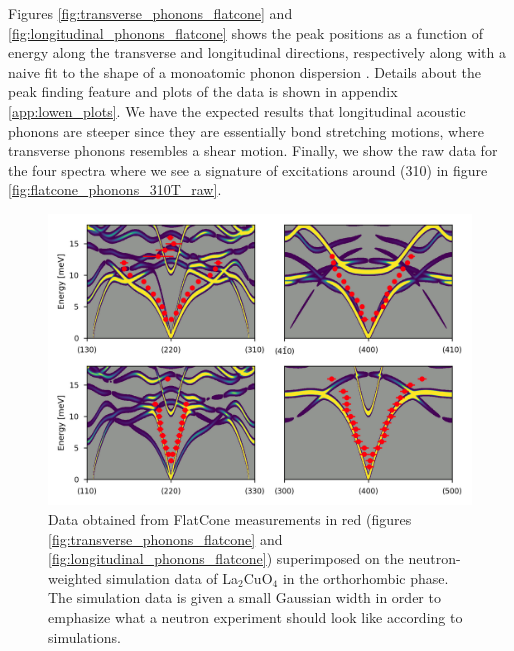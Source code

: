 Figures \ref{fig:transverse_phonons_flatcone} and \ref{fig:longitudinal_phonons_flatcone} shows the peak positions as a function of energy along the transverse and longitudinal directions, respectively along with a naive fit to the shape of a monoatomic phonon dispersion \cite{Kittel2005}. Details about the peak finding feature and plots of the data is shown in appendix \ref{app:lowen_plots}. We have the expected results that longitudinal acoustic phonons are steeper since they are essentially bond stretching motions, where transverse phonons resembles a shear motion. Finally, we show the raw data for the four spectra where we see a signature of excitations around (310) in figure \ref{fig:flatcone_phonons_310T_raw}.

\begin{figure}
    \centering
    \includegraphics[width=\textwidth]{fig/lowen/flatcone_fits_simulation_lto_afm.png}
    \caption[FlatCone dispersion and neutron weighted simulation data]{Data obtained from FlatCone measurements in red (figures \ref{fig:transverse_phonons_flatcone} and \ref{fig:longitudinal_phonons_flatcone}) superimposed on the neutron-weighted simulation data of La$_2$CuO$_4$ in the orthorhombic phase. The simulation data is given a small Gaussian width in order to emphasize what a neutron experiment should look like according to simulations.}
    \label{fig:flatcone_phonons_dispersion_simulation}
\end{figure}

